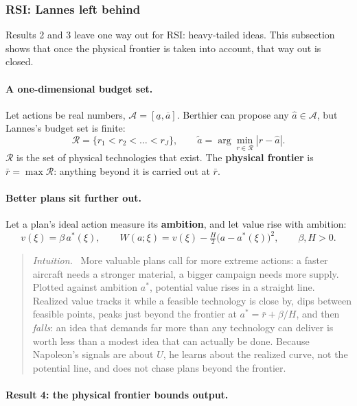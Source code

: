 \documentclass[11pt]{article}
\newcommand{\Nap}{\textcolor{nap}{Napoleon}}
\newcommand{\Ber}{\textcolor{ber}{Berthier}}
\newcommand{\Lan}{\textcolor{lan}{Lannes}}
\theoremstyle{remark}
\newenvironment{intuition}{\begin{quote}\small\color{muted}\textit{Intuition.}\ }{\end{quote}}
\newcommand{\Rcal}{\mathcal{R}}
\newcommand{\Acal}{\mathcal{A}}
\begin{document}
\subsubsection{RSI: \texorpdfstring{\Lan}{Lannes} left behind}\label{sec:physical}

Results 2 and 3 leave one way out for RSI: heavy-tailed ideas. This subsection shows that once the physical frontier is taken into account, that way out is closed.

\paragraph{A one-dimensional budget set.} Let actions be real numbers, $\Acal=[\underline a,\overline a]$. \Ber{} can propose any $\hat a\in\Acal$, but \Lan's budget set is finite:
\[
\Rcal=\{r_1<r_2<\dots<r_J\},\qquad\tilde a=\arg\min_{r\in\Rcal}|r-\hat a|.
\]
$\Rcal$ is the set of physical technologies that exist. The \textbf{physical frontier} is $\bar r=\max\Rcal$: anything beyond it is carried out at $\bar r$.

\paragraph{Better plans sit further out.} Let a plan's ideal action measure its \textbf{ambition}, and let value rise with ambition:
\begin{equation}\label{eq:ambition}
v(\xi)=\beta\,a^*(\xi),\qquad W(a;\xi)=v(\xi)-\tfrac H2\big(a-a^*(\xi)\big)^2,\qquad\beta,H>0.
\end{equation}

\begin{intuition}
More valuable plans call for more extreme actions: a faster aircraft needs a stronger material, a bigger campaign needs more supply. Plotted against ambition $a^*$, potential value rises in a straight line. Realized value tracks it while a feasible technology is close by, dips between feasible points, peaks just beyond the frontier at $a^*=\bar r+\beta/H$, and then \emph{falls}: an idea that demands far more than any technology can deliver is worth less than a modest idea that can actually be done. Because \Nap's signals are about $U$, he learns about the realized curve, not the potential line, and does not chase plans beyond the frontier.
\end{intuition}

\paragraph{Result 4: the physical frontier bounds output.}
\end{document}

